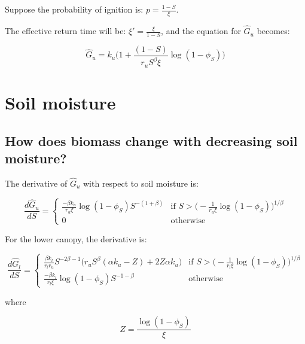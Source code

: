 \documentclass{article}
\begin{document}
Suppose the probability of ignition is: $p = \frac{1-S}{\xi}$.

The effective return time will be: $\xi' = \frac{\xi} { 1- S}$, and the equation for $\hat{G}_u $ becomes:

\begin{equation}
\hat{G}_u =
  k_u \big( 1 + \frac{(1-S)}{r_u S^\beta \xi} \log(1-\phi_S) \big)
\end{equation}



\section{Soil moisture}

\subsection{How does biomass change with decreasing soil moisture?}

    The derivative of $\hat G_u$ with respect to soil moisture is:
    
    \begin{equation}
    \frac{ d\hat{G}_u }{dS} =
        \begin{cases}
          \frac{-\beta k_u }{r_u \xi} \log(1-\phi_S) S^{-(1+\beta)}
    		& \text{if  } S > \big( - \frac{1}{r_u \xi }\log (1 - \phi_S)\big)^{1/\beta}
    		\\[10pt]
          0 & \text{otherwise}
        \end{cases}
    \end{equation}
    
    
    For the lower canopy, the derivative is:
    
    \begin{equation}
    \frac{ d\hat{G}_l }{dS} =
        \begin{cases}
    	  \frac{\beta  {k_l} }{{r_l} {r_u}} S^{-2 \beta -1}
    \big( {r_u} S^{\beta }(\alpha  {k_u}  - Z) +2 Z \alpha  {k_u}
       \big)
    	  & \text{if  } S > \big( - \frac{1}{r_l \xi }\log (1 - \phi_S)\big)^{1/\beta}
    		\\[10pt]
            \frac{-\beta k_l }{r_l \xi} \log(1-\phi_S) S^{-1-\beta} & \text{otherwise}
        \end{cases}
    \end{equation}
    
    
    where
    
    \begin{equation}
    Z = \frac{\log({1-\phi_S})}{\xi}
    \end{equation}
    
\end{document}
